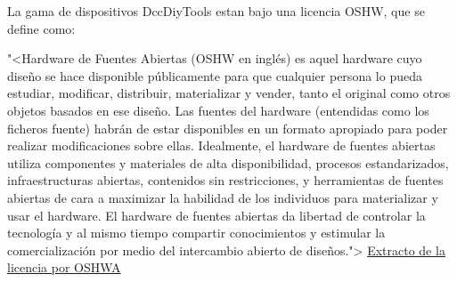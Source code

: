 
La gama de dispositivos DccDiyTools estan bajo una licencia OSHW, que se define como:

"<Hardware de Fuentes Abiertas (OSHW en inglés) es aquel hardware cuyo diseño se hace disponible
públicamente para que cualquier persona lo pueda estudiar, modificar, distribuir, materializar
y vender, tanto el original como otros objetos basados en ese diseño. Las fuentes del hardware
(entendidas como los ficheros fuente) habrán de estar disponibles en un formato apropiado para
poder realizar modificaciones sobre ellas. Idealmente, el hardware de fuentes abiertas utiliza
componentes y materiales de alta disponibilidad, procesos estandarizados, infraestructuras abiertas,
contenidos sin restricciones, y herramientas de fuentes abiertas de cara a maximizar la habilidad
de los individuos para materializar y usar el hardware. El hardware de fuentes abiertas da libertad
de controlar la tecnología y al mismo tiempo compartir conocimientos y estimular la comercialización
por medio del intercambio abierto de diseños.">
\href{https://www.oshwa.org/definition/spanish/}{Extracto de la licencia por OSHWA}


